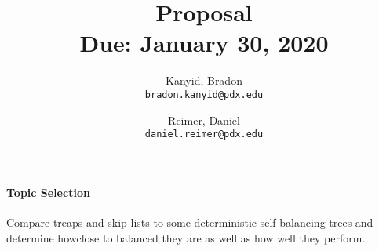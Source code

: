 \documentclass[11pt]{article}
\title{\bf Proposal \\[2ex]
\rm\normalsize Due: January 30, 2020}
\date{}
\author{
  Kanyid, Bradon\\
  \texttt{bradon.kanyid@pdx.edu}
  \and
  Reimer, Daniel\\
  \texttt{daniel.reimer@pdx.edu}
}
\begin{document}
\maketitle

\paragraph{Topic Selection}
Compare treaps and skip lists to some deterministic self-balancing trees and determine howclose to balanced they are as well as how well they perform.
\end{document}
